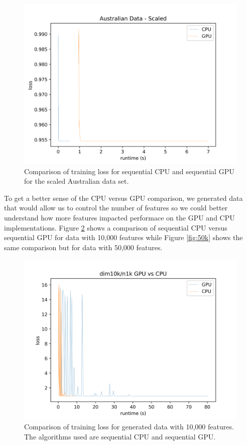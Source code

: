 \documentclass{article}
\begin{document}
\begin{figure}
  \includegraphics[scale=0.5]{cpu_vs_gpu}
  \centering
  \caption{Comparison of training loss for sequential CPU and sequential GPU for
    the scaled Australian data set.}
  \label{fig:australian}
\end{figure}

To get a better sense of the CPU versus GPU comparison, we generated data that
would allow us to control the number of features so we could better understand
how more features impacted performace on the GPU and CPU implementations. Figure
\ref{fig:10k} shows a comparison of sequential CPU versus sequential GPU for
data with 10,000 features while Figure \ref{fig:50k} shows the same comparison
but for data with 50,000 features.

\begin{figure}
  \centering
  \includegraphics[scale=0.65]{dim10k_CPU_GPU}
  \caption{Comparison of training loss for generated data with 10,000
    features. The algorithms used are sequential CPU and sequential GPU.}
  \label{fig:10k}
\end{figure}
\end{document}
